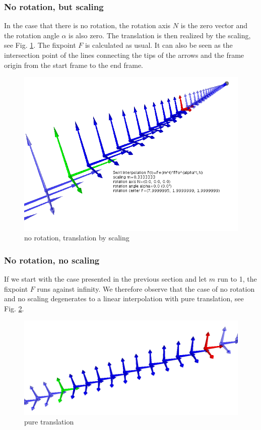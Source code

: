 \documentclass[tikz, journal, letterpaper]{IEEEtran}
\begin{document}
\subsubsection{No rotation, but scaling}\label{NoRot}
In the case that there is no rotation, the rotation axis $N$ is the zero vector and the rotation angle $\alpha$ is also zero.
The translation is then realized by the scaling, see Fig. \ref{fig:P2}. The fixpoint $F$ is calculated as usual. It can also be seen as the intersection point of the lines connecting the tips of the arrows and the frame origin from the start frame to the end frame.
\begin{figure}
	\centering
		\includegraphics[scale=0.4]{pictures/P2.png}
	\caption{no rotation, translation by scaling}
	\label{fig:P2}
\end{figure}

\subsubsection{No rotation, no scaling}
If we start with the case presented in the previous section and let $m$ run to 1, the fixpoint $F$ runs against infinity. We therefore observe that the case of no rotation and no scaling degenerates to a linear interpolation with pure translation, see Fig. \ref{fig:P5}.
\begin{figure}
	\centering
		\includegraphics[scale=0.4]{pictures/P5.png}
	\caption{pure translation}
	\label{fig:P5}
\end{figure}
\end{document}
